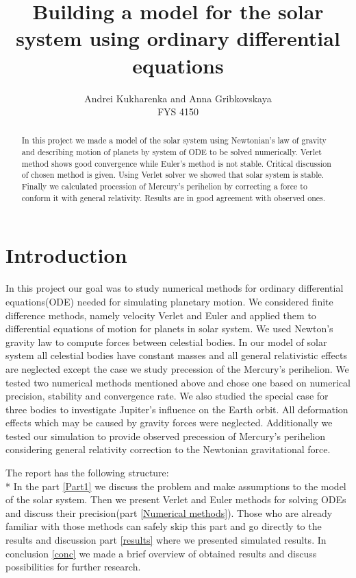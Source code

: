 \documentclass[10pt]{article}
\begin{document}
\setlength\parindent{1pt}
\title{Building a model for the solar system using ordinary differential equations}
\author{Andrei Kukharenka and Anna Gribkovskaya \\  
FYS 4150 
}

\maketitle
\begin{abstract}
In this project we made a model of the solar system using Newtonian's law of gravity and describing motion of planets by system of ODE to be solved numerically. Verlet method shows good convergence while Euler's method is not stable. Critical discussion of chosen method is given. Using Verlet solver we showed that solar system is stable. Finally we calculated procession of Mercury's perihelion by correcting a force to conform it with general relativity. Results are in good agreement with observed ones. 
\end{abstract}
\clearpage 


\section{Introduction}

In this project our goal was to study numerical methods for ordinary differential equations(ODE) needed for simulating planetary motion. We considered finite difference methods, namely velocity Verlet and Euler and applied them to differential equations of motion for planets in solar system. We used Newton's gravity law to compute forces between celestial bodies. In our model of solar system all celestial bodies have constant masses and all general relativistic effects are neglected except the case we study precession of the Mercury's perihelion. 
We tested two numerical methods mentioned above and chose one based on numerical precision, stability and convergence rate. We also studied the special case for three bodies to investigate Jupiter's influence on the Earth orbit. All deformation effects which may be caused by gravity forces were neglected. 
Additionally we tested our simulation to provide observed precession of Mercury's perihelion considering general relativity correction to the Newtonian gravitational force.

The report has the following structure:\\*
In the part \ref{Part1}  we discuss the problem and make assumptions to the model of the solar system. Then we present Verlet and Euler methods for solving ODEs and discuss their precision(part \ref{Numerical methods}). Those who are already familiar with those methods can safely skip this part and go directly to the results and discussion part \ref{results}  where we presented simulated results. In conclusion \ref{conc} we made a brief overview of obtained results and discuss possibilities for further research. 
\end{document}
